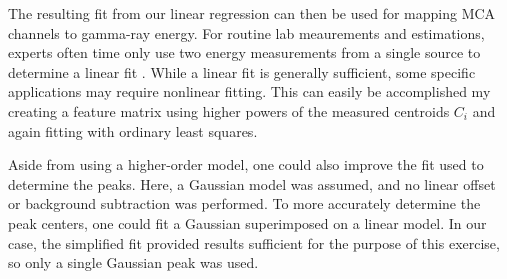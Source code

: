 The resulting fit from our linear regression can then be used for mapping
MCA channels to gamma-ray energy. For routine lab meaurements and estimations,
experts often time only use two energy measurements from a single source to determine a linear fit
\cite{gilmore_2011}. While a linear fit is generally sufficient, some
specific applications may require nonlinear fitting. This can easily be accomplished
my creating a feature matrix using higher powers of the measured centroids $C_i$ and
again fitting with ordinary least squares.

Aside from using a higher-order model, one could also improve the fit used to
determine the peaks. Here, a Gaussian model was assumed, and no linear offset
or background subtraction was performed. To more accurately determine the peak centers,
one could fit a Gaussian superimposed on a linear model. In our case, the
simplified fit provided results sufficient for the purpose of this exercise,
so only a single Gaussian peak was used.
